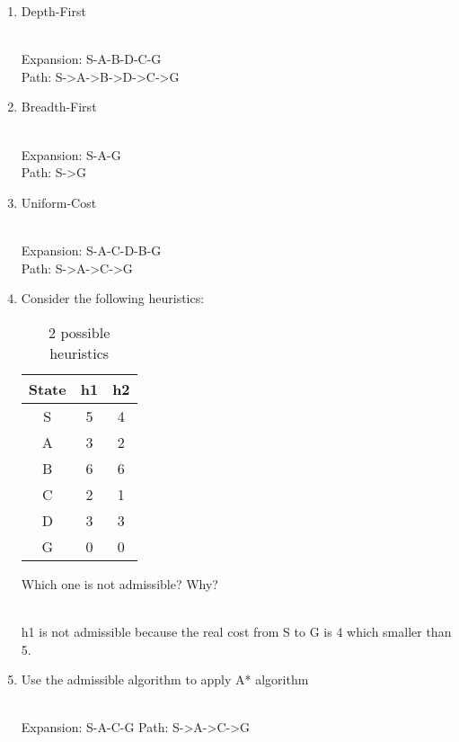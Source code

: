 \documentclass[9pt,a4paper]{extarticle}
\newenvironment{solution}
    {%
    \color{red}
    }
    { 
    \color{black}
    }
\begin{document}
\begin{enumerate}
    \item Depth-First
    \begin{solution}
    \\
    Expansion: S-A-B-D-C-G\\
    Path: S->A->B->D->C->G
    \end{solution}
    \item Breadth-First
    \begin{solution}
    \\
    Expansion: S-A-G\\
    Path: S->G
    \end{solution}
    \item Uniform-Cost
    \begin{solution}
    \\
    Expansion: S-A-C-D-B-G\\
    Path: S->A->C->G
    \end{solution}
    \item Consider the following heuristics:
    \begin{table}[h]
        \centering
        \begin{tabular}{|c|c|c|}
        \hline
            State & h1 & h2 \\ \hline
            S & 5 & 4\\ \hline
            A & 3 & 2\\ \hline
            B & 6 & 6\\ \hline
            C & 2 & 1\\ \hline
            D & 3 & 3\\ \hline
            G & 0 & 0\\ \hline
        \end{tabular}
        \caption{2 possible heuristics}
        \label{tab:my_label}
    \end{table}
    Which one is not admissible? Why?
    \begin{solution}
    \\
    h1 is not admissible because the real cost from S to G is 4 which smaller than 5.
    \end{solution}
    \item Use the admissible algorithm to apply A* algorithm
    \begin{solution}
    \\
    Expansion: S-A-C-G
    Path: S->A->C->G
    \end{solution}
\end{enumerate}
\end{document}
